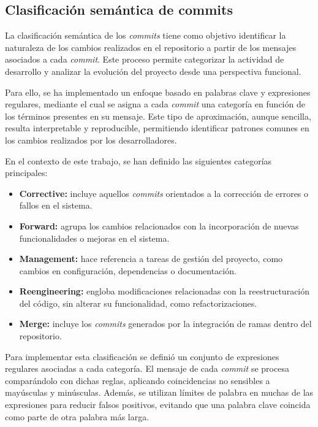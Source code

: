 \documentclass[a4paper, 12pt]{book}
\begin{document}
\subsection{Clasificación semántica de commits}
\label{subsec:clasificacion}

La clasificación semántica de los \emph{commits} tiene como objetivo identificar la naturaleza de los cambios realizados en el repositorio a partir de los mensajes asociados a cada \emph{commit}. Este proceso permite categorizar la actividad de desarrollo y analizar la evolución del proyecto desde una perspectiva funcional.

Para ello, se ha implementado un enfoque basado en palabras clave y expresiones regulares, mediante el cual se asigna a cada \emph{commit} una categoría en función de los términos presentes en su mensaje. Este tipo de aproximación, aunque sencilla, resulta interpretable y reproducible, permitiendo identificar patrones comunes en los cambios realizados por los desarrolladores.

En el contexto de este trabajo, se han definido las siguientes categorías principales:

\begin{itemize}

\item \textbf{Corrective:} incluye aquellos \emph{commits} orientados a la corrección de errores o fallos en el sistema.

\item \textbf{Forward:} agrupa los cambios relacionados con la incorporación de nuevas funcionalidades o mejoras en el sistema.

\item \textbf{Management:} hace referencia a tareas de gestión del proyecto, como cambios en configuración, dependencias o documentación.

\item \textbf{Reengineering:} engloba modificaciones relacionadas con la reestructuración del código, sin alterar su funcionalidad, como refactorizaciones.

\item \textbf{Merge:} incluye los \emph{commits} generados por la integración de ramas dentro del repositorio.

\end{itemize}

Para implementar esta clasificación se definió un conjunto de expresiones regulares asociadas a cada categoría. El mensaje de cada \emph{commit} se procesa comparándolo con dichas reglas, aplicando coincidencias no sensibles a mayúsculas y minúsculas. Además, se utilizan límites de palabra en muchas de las expresiones para reducir falsos positivos, evitando que una palabra clave coincida como parte de otra palabra más larga.
\end{document}
